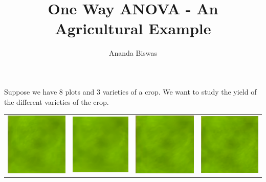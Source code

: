 \documentclass[11pt, a4paper]{article}\usepackage[]{graphicx}\usepackage[]{xcolor}
\title{One Way ANOVA - An Agricultural Example}
\author{Ananda Biswas}
\date{}
\begin{document}
\maketitle

Suppose we have 8 plots and 3 varieties of a crop. We want to study the yield of the different varieties of the crop.


\begin{table}[H]

\begin{center}

\begin{tabular}{cccc}

\includegraphics[scale = 0.5]{plot 1} & \includegraphics[scale = 0.52]{plot 2} & \includegraphics[scale = 0.5]{plot 3} & \includegraphics[scale = 0.5]{plot 4}\\


\end{tabular}
\end{center}
\end{table}
\end{document}
